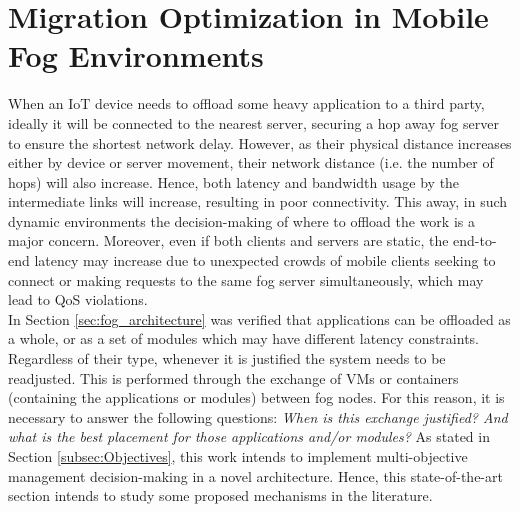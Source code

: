 \section{Migration Optimization in Mobile Fog Environments}
\label{sec:Migration}
When an IoT device needs to offload some heavy application to a third party, ideally it will be connected to the nearest server, securing a hop away fog server to ensure the shortest network delay. However, as their physical distance increases either by device or server movement, their network distance (i.e. the number of hops) will also increase. Hence, both latency and bandwidth usage by the intermediate links will increase, resulting in poor connectivity. This away, in such dynamic environments the decision-making of where to offload the work is a major concern. Moreover, even if both clients and servers are static, the end-to-end latency may increase due to unexpected crowds of mobile clients seeking to connect or making requests to the same fog server simultaneously, which may lead to QoS violations.\\
\noindent\tab In Section \ref{sec:fog_architecture} was verified that applications can be offloaded as a whole, or as a set of modules which may have different latency constraints. Regardless of their type, whenever it is justified the system needs to be readjusted. This is performed through the exchange of VMs or containers (containing the applications or modules) between fog nodes. For this reason, it is necessary to answer the following questions: \textit{When is this exchange justified? And what is the best placement for those applications and/or modules?} As stated in Section \ref{subsec:Objectives}, this work intends to implement multi-objective management decision-making in a novel architecture. Hence, this state-of-the-art section intends to study some proposed mechanisms in the literature.

